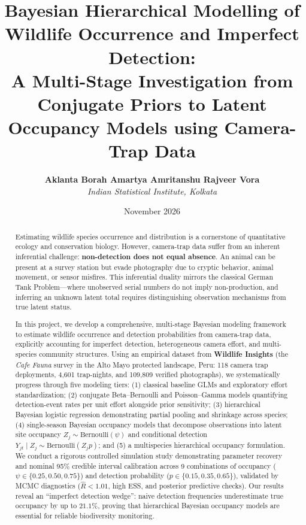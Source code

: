 \documentclass[11pt,a4paper]{article}
\title{\textbf{Bayesian Hierarchical Modelling of Wildlife Occurrence and Imperfect Detection:}\\ \large A Multi-Stage Investigation from Conjugate Priors to Latent Occupancy Models using Camera-Trap Data}
\author{\textbf{Aklanta Borah \qquad Amartya Amritanshu \qquad Rajveer Vora} \\
\textit{Indian Statistical Institute, Kolkata}}
\date{November 2026}
\begin{document}
\maketitle

\begin{abstract}
Estimating wildlife species occurrence and distribution is a cornerstone of quantitative ecology and conservation biology. However, camera-trap data suffer from an inherent inferential challenge: \textbf{non-detection does not equal absence}. An animal can be present at a survey station but evade photography due to cryptic behavior, animal movement, or sensor misfires. This inferential duality mirrors the classical German Tank Problem---where unobserved serial numbers do not imply non-production, and inferring an unknown latent total requires distinguishing observation mechanisms from true latent status. 

In this project, we develop a comprehensive, multi-stage Bayesian modeling framework to estimate wildlife occurrence and detection probabilities from camera-trap data, explicitly accounting for imperfect detection, heterogeneous camera effort, and multi-species community structures. Using an empirical dataset from \textbf{Wildlife Insights} (the \textit{Cafe Fauna} survey in the Alto Mayo protected landscape, Peru: 118 camera trap deployments, 4,601 trap-nights, and 109,809 verified photographs), we systematically progress through five modeling tiers: (1) classical baseline GLMs and exploratory effort standardization; (2) conjugate Beta--Bernoulli and Poisson--Gamma models quantifying detection-event rates per unit effort alongside prior sensitivity; (3) hierarchical Bayesian logistic regression demonstrating partial pooling and shrinkage across species; (4) single-season Bayesian occupancy models that decompose observations into latent site occupancy $Z_j \sim \text{Bernoulli}(\psi)$ and conditional detection $Y_{jt} \mid Z_j \sim \text{Bernoulli}(Z_j p)$; and (5) a multispecies hierarchical occupancy formulation. We conduct a rigorous controlled simulation study demonstrating parameter recovery and nominal 95\% credible interval calibration across 9 combinations of occupancy ($\psi \in \{0.25, 0.50, 0.75\}$) and detection probability ($p \in \{0.15, 0.35, 0.65\}$), validated by MCMC diagnostics ($\hat{R} < 1.01$, high ESS, and posterior predictive checks). Our results reveal an ``imperfect detection wedge'': naive detection frequencies underestimate true occupancy by up to $21.1\%$, proving that hierarchical Bayesian occupancy models are essential for reliable biodiversity monitoring.
\end{abstract}
\end{document}
